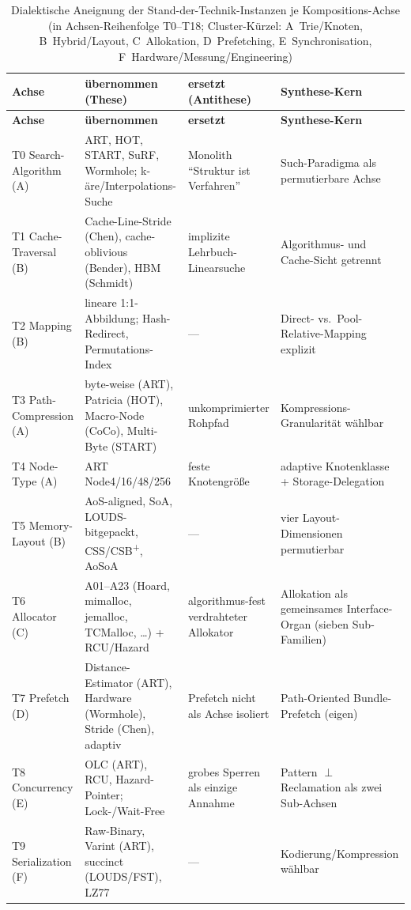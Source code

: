 {\footnotesize
\begin{longtable}{@{}p{2.3cm}p{3.7cm}p{2.7cm}p{3.6cm}@{}}
\caption{Dialektische Aneignung der Stand-der-Technik-Instanzen je Kompositions-Achse (in Achsen-Reihenfolge T0--T18; Cluster-Kürzel: A~Trie/Knoten, B~Hybrid/Layout, C~Allokation, D~Prefetching, E~Synchronisation, F~Hardware/Messung/Engineering)}\label{tab:dialectic}\\
\toprule
\textbf{Achse} & \textbf{übernommen (These)} & \textbf{ersetzt (Antithese)} & \textbf{Synthese-Kern} \\
\midrule
\endfirsthead%
\toprule
\textbf{Achse} & \textbf{übernommen} & \textbf{ersetzt} & \textbf{Synthese-Kern} \\
\midrule
\endhead%
\bottomrule
\endlastfoot%
T0 Search-Algorithm (A) & ART, HOT, START, SuRF, Wormhole; k-äre/Interpolations-Suche & Monolith \enquote{Struktur ist Verfahren} & Such-Paradigma als permutierbare Achse \\
T1 Cache-Traversal (B) & Cache-Line-Stride (Chen), cache-oblivious (Bender), HBM (Schmidt) & implizite Lehrbuch-Linearsuche & Algorithmus- und Cache-Sicht getrennt \\
T2 Mapping (B) & lineare 1:1-Abbildung; Hash-Redirect, Permutations-Index & --- & Direct- vs.\ Pool-Relative-Mapping explizit \\
T3 Path-Compression (A) & byte-weise (ART), Patricia (HOT), Macro-Node (CoCo), Multi-Byte (START) & unkomprimierter Rohpfad & Kompressions-Granularität wählbar \\
T4 Node-Type (A) & ART Node4/16/48/256 & feste Knotengröße & adaptive Knotenklasse + Storage-Delegation \\
T5 Memory-Layout (B) & AoS-aligned, SoA, LOUDS-bitgepackt, CSS/CSB\textsuperscript{+}, AoSoA & --- & vier Layout-Dimensionen permutierbar \\
T6 Allocator (C) & A01--A23 (Hoard, mimalloc, jemalloc, TCMalloc, \ldots) + RCU/Hazard & algorithmus-fest verdrahteter Allokator & Allokation als gemeinsames Interface-Organ (sieben Sub-Familien) \\
T7 Prefetch (D) & Distance-Estimator (ART), Hardware (Wormhole), Stride (Chen), adaptiv & Prefetch nicht als Achse isoliert & Path-Oriented Bundle-Prefetch (eigen) \\
T8 Concurrency (E) & OLC (ART), RCU, Hazard-Pointer; Lock-/Wait-Free & grobes Sperren als einzige Annahme & Pattern $\perp$ Reclamation als zwei Sub-Achsen \\
T9 Serialization (F) & Raw-Binary, Varint (ART), succinct (LOUDS/FST), LZ77 & --- & Kodierung/Kompression wählbar \\

\end{longtable}}
